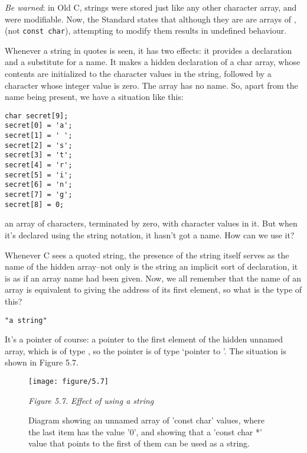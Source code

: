    \textit{Be warned}: in Old C, strings were stored just like any other
    character array, and were modifiable. Now, the Standard states that
    although they are are arrays of \kchar, (not \texttt{const
    char}), attempting to modify them results in undefined
    behaviour.


   Whenever a string in quotes is seen, it has two effects: it provides
    a declaration and a substitute for a name. It makes a hidden declaration
    of a char array, whose contents are initialized to the character values
    in the string, followed by a character whose integer value is zero. The
    array has no name. So, apart from the name being present, we have
    a situation like this:


   \begin{Verbatim}
char secret[9];
secret[0] = 'a';
secret[1] = ' ';
secret[2] = 's';
secret[3] = 't';
secret[4] = 'r';
secret[5] = 'i';
secret[6] = 'n';
secret[7] = 'g';
secret[8] = 0;
\end{Verbatim}

   an array of characters, terminated by zero, with character values in
    it. But when it's declared using the string notation, it hasn't got
    a name. How can we use it?


   Whenever C sees a quoted string, the presence of the string itself
    serves as the name of the hidden array--not only is the string an
    implicit sort of declaration, it is as if an array name had been given.
    Now, we all remember that the name of an array is equivalent to giving
    the address of its first element, so what is the type of this?


   \begin{Verbatim}
"a string"
\end{Verbatim}

   It's a pointer of course: a pointer to the first element of the hidden
    unnamed array, which is of type \kchar, so the pointer is of
    type `pointer to \kchar'. The situation is shown in
    Figure 5.7.


    \begin{figure*}[htb]\centering
      \texttt{[image: figure/5.7]}
      \caption{Diagram showing an unnamed array of 'const char' values, where the            last item has the value '0', and showing that a 'const char *'            value that points to the first of them can be used as a string.}
    \begin{center}\textit{Figure 5.7. Effect of using a string}\end{center}
    \end{figure*}



